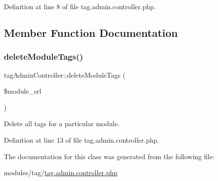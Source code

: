 Definition at line 8 of file tag.\+admin.\+controller.\+php.



\subsection{Member Function Documentation}
\hypertarget{classtagAdminController_a26a0cf3fda1e1d57de9810e76dd72765}{}\label{classtagAdminController_a26a0cf3fda1e1d57de9810e76dd72765} 
\subsubsection{\texorpdfstring{delete\+Module\+Tags()}{deleteModuleTags()}}
{\footnotesize\ttfamily tag\+Admin\+Controller\+::delete\+Module\+Tags (\begin{DoxyParamCaption}\item[{}]{\$module\+\_\+srl }\end{DoxyParamCaption})}



Delete all tags for a particular module. 



Definition at line 13 of file tag.\+admin.\+controller.\+php.



The documentation for this class was generated from the following file\+:\begin{DoxyCompactItemize}
\item 
modules/tag/\hyperlink{tag_8admin_8controller_8php}{tag.\+admin.\+controller.\+php}\end{DoxyCompactItemize}

